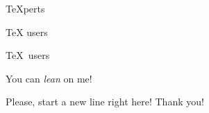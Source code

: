 \documentclass{article}
\begin{document}
\TeX perts

\TeX{} users

\TeX\ users

You can \textsl{lean} on me!

Please, start a new line right here!\newline
Thank you!
\end{document}
